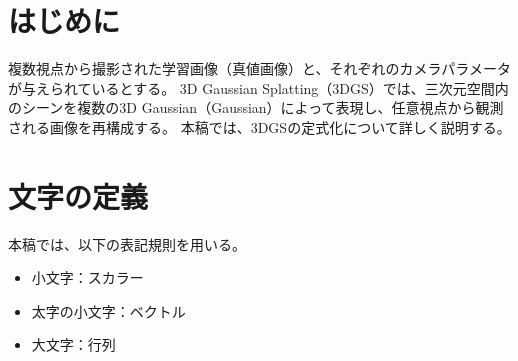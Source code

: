 \documentclass[dvipdfmx]{jlreq}
\begin{document}
\pagestyle{fancy}
\setlength{\columnseprule}{0.4pt}


\vspace{3mm}

\section{はじめに}
複数視点から撮影された学習画像（真値画像）と、それぞれのカメラパラメータが与えられているとする。
3D Gaussian Splatting（3DGS）では、三次元空間内のシーンを複数の3D Gaussian（Gaussian）によって表現し、任意視点から観測される画像を再構成する。
本稿では、3DGSの定式化について詳しく説明する。

\section{文字の定義}
本稿では、以下の表記規則を用いる。

\begin{itemize}
    \item 小文字：スカラー
    \item 太字の小文字：ベクトル
    \item 大文字：行列
\end{itemize}
\end{document}
